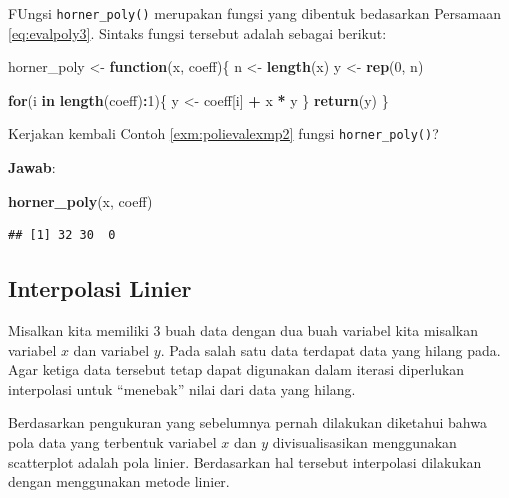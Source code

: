 \documentclass[]{book}
\newenvironment{Shaded}{\begin{snugshade}}{\end{snugshade}}
\newcommand{\ControlFlowTok}[1]{\textcolor[rgb]{0.13,0.29,0.53}{\textbf{#1}}}
\newcommand{\DecValTok}[1]{\textcolor[rgb]{0.00,0.00,0.81}{#1}}
\newcommand{\KeywordTok}[1]{\textcolor[rgb]{0.13,0.29,0.53}{\textbf{#1}}}
\newcommand{\NormalTok}[1]{#1}
\newcommand{\OperatorTok}[1]{\textcolor[rgb]{0.81,0.36,0.00}{\textbf{#1}}}
\newcommand{\StringTok}[1]{\textcolor[rgb]{0.31,0.60,0.02}{#1}}
\theoremstyle{definition}
\theoremstyle{definition}
\theoremstyle{definition}
\theoremstyle{remark}
\let\BeginKnitrBlock\begin \let\EndKnitrBlock\end
\begin{document}
FUngsi \texttt{horner\_poly()} merupakan fungsi yang dibentuk bedasarkan Persamaan \eqref{eq:evalpoly3}. Sintaks fungsi tersebut adalah sebagai berikut:

\begin{Shaded}
\begin{Highlighting}[]
\NormalTok{horner_poly <-}\StringTok{ }\ControlFlowTok{function}\NormalTok{(x, coeff)\{}
\NormalTok{  n <-}\StringTok{ }\KeywordTok{length}\NormalTok{(x)}
\NormalTok{  y <-}\StringTok{ }\KeywordTok{rep}\NormalTok{(}\DecValTok{0}\NormalTok{, n)}
  
  \ControlFlowTok{for}\NormalTok{(i }\ControlFlowTok{in} \KeywordTok{length}\NormalTok{(coeff)}\OperatorTok{:}\DecValTok{1}\NormalTok{)\{}
\NormalTok{    y <-}\StringTok{ }\NormalTok{coeff[i] }\OperatorTok{+}\StringTok{ }\NormalTok{x }\OperatorTok{*}\StringTok{ }\NormalTok{y}
\NormalTok{  \}}
  \KeywordTok{return}\NormalTok{(y)}
\NormalTok{\}}
\end{Highlighting}
\end{Shaded}

\BeginKnitrBlock{example}
\protect\hypertarget{exm:polievalexmp3}{}{\label{exm:polievalexmp3} }Kerjakan kembali Contoh \ref{exm:polievalexmp2} fungsi \texttt{horner\_poly()}?
\EndKnitrBlock{example}

\textbf{Jawab}:

\begin{Shaded}
\begin{Highlighting}[]
\KeywordTok{horner_poly}\NormalTok{(x, coeff)}
\end{Highlighting}
\end{Shaded}

\begin{verbatim}
## [1] 32 30  0
\end{verbatim}

\hypertarget{lininterpol}{%
\subsection{Interpolasi Linier}\label{lininterpol}}

Misalkan kita memiliki 3 buah data dengan dua buah variabel kita misalkan variabel \(x\) dan variabel \(y\). Pada salah satu data terdapat data yang hilang pada. Agar ketiga data tersebut tetap dapat digunakan dalam iterasi diperlukan interpolasi untuk ``menebak'' nilai dari data yang hilang.

Berdasarkan pengukuran yang sebelumnya pernah dilakukan diketahui bahwa pola data yang terbentuk variabel \(x\) dan \(y\) divisualisasikan menggunakan scatterplot adalah pola linier. Berdasarkan hal tersebut interpolasi dilakukan dengan menggunakan metode linier.
\end{document}
